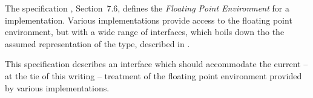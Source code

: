 \documentclass[../Dictionary.tex]{subfiles}
\begin{document}
\label{sect:floating-point-env}

The \CLang{} specification \cite{2018:C18}, Section~7.6, defines the \emph{Floating
  Point Environment} for a \CLang{} implementation.  Various \CL{}
implementations provide access to the floating point environment, but
with a wide range of interfaces, which boils down tho the assumed
representation of the \CLang{}  type, described in
\cite{2018:C18}.

This specification describes an interface which should accommodate the
current -- at the tie of this writing -- treatment of the floating
point environment provided by various \CL{} implementations.







\end{document}
